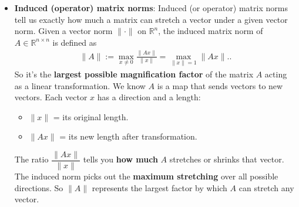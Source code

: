 \documentclass{report}
\begin{document}
\begin{itemize}
        \item \textbf{Induced (operator) matrix norms}:     Induced (or operator) matrix norms tell us exactly how much a matrix can stretch a vector under a given vector norm.
            Given a vector norm  $\|\cdot\|$ on $\mathbb{R}^n$, the induced matrix norm of 
            $A \in \mathbb{R}^{n \times n}$ is defined as
            \begin{align*}
                \|A\| := \max_{x \neq 0} \frac{\|Ax\|}{\|x\|} = \max_{\|x\| = 1} \|Ax\|.
            .\end{align*}
            So it’s the \textbf{largest possible magnification factor} of the matrix $A$ acting as a linear transformation.
            \bigbreak \noindent 
            We know $A$ is a map that sends vectors to new vectors.  Each vector $x$ has a direction and a length:
            \begin{itemize}
                \item $\|x\|$ = its original length.
                \item $\|Ax\|$ = its new length after transformation.
            \end{itemize}
            The ratio $\dfrac{\|Ax\|}{\|x\|}$ tells you \textbf{how much} $A$ stretches or shrinks that vector.
            \bigbreak \noindent 
            The induced norm picks out the \textbf{maximum stretching} over all possible directions.  
            So $\|A\|$ represents the largest factor by which $A$ can stretch any vector.
       

\end{itemize}
\end{document}
